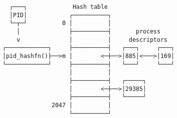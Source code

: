 \documentclass[varwidth=36em]{standalone}
\begin{document}
\begin{verbatim}
  ┌───┐             Hash table
  │PID│            ┌──────────┐
  └─┬─┘          0 │          │
    │              ├──────────┤       process 
    v              │          │     descriptors
┌────────────┐     ├──────────┤   ┌───┐     ┌───┐
│pid_hashfn()├──>m │        <─┼──>│885│<───>│169│
└────────────┘     ├──────────┤   └───┘     └───┘
                   │          │
                   ├──────────┤   ┌─────┐
                   │        <─┼──>│29385│
                   ├──────────┤   └─────┘
              2047 │          │
                   └──────────┘
\end{verbatim}
\end{document}
